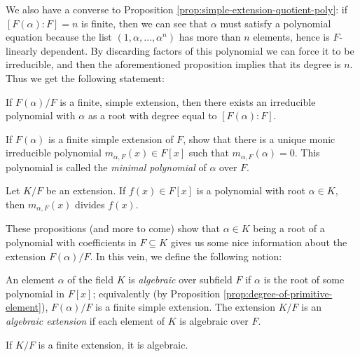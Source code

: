 \documentclass[10pt]{article}
\providecommand{\vocab}[1]{{{\sffamily\textit{#1}}}}
\begin{document}
We also have a converse to
Proposition \ref{prop:simple-extension-quotient-poly}:
if $[F(\alpha) : F] = n$ is finite,
then we can see that $\alpha$ must satisfy a polynomial equation because
the list $(1,\alpha,\dots,\alpha^n)$ has more than $n$ elements,
hence is $F$-linearly dependent.
By discarding factors of this polynomial we can force it to be irreducible,
and then the aforementioned proposition implies that its degree is $n$.
Thus we get the following statement:
\begin{prop}
    \label{prop:degree-of-primitive-element}
    If $F(\alpha)/F$ is a finite, simple extension,
    then there exists an irreducible polynomial with $\alpha$ as a root
    with degree equal to $[F(\alpha):F]$.
\end{prop}

\begin{exercise}
    If $F(\alpha)$ is a finite simple extension of $F$,
    show that there is a unique monic irreducible polynomial
    $m_{\alpha,F}(x)\in F[x]$ such that $m_{\alpha,F}(\alpha) = 0$.
    This polynomial is called the \vocab{minimal polynomial}
    of $\alpha$ over $F$.
\end{exercise}

\begin{prop}
    \label{prop:min-poly-divides-poly}
    Let $K/F$ be an extension.
    If $f(x)\in F[x]$ is a polynomial with root $\alpha\in K$, then
    $m_{\alpha,F}(x)$ divides $f(x)$.
\end{prop}

These propositions (and more to come) show that
$\alpha\in K$ being a root of a polynomial
with coefficients in $F\subseteq K$ 
gives us some nice information about the extension $F(\alpha)/F$.
In this vein, we define the following notion:
\begin{definition}
    \label{def:algebraic}
    An element $\alpha$ of the field $K$ is
    \vocab{algebraic} over subfield $F$
    if $\alpha$ is the root of some polynomial in $F[x]$;
    equivalently (by Proposition \ref{prop:degree-of-primitive-element}),
    $F(\alpha)/F$ is a finite simple extension.
    The extension $K/F$ is an \vocab{algebraic extension}
    if each element of $K$ is algebraic over $F$.
\end{definition}

\begin{prop}
    \label{prop:finite-extensions-are-algebraic}
    If $K/F$ is a finite extension, it is algebraic.
\end{prop}
\end{document}
